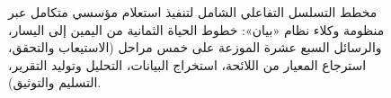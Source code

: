 \begin{figure}[H]
  \centering
  \resizebox{\textwidth}{!}{}
  \caption[مخطط التسلسل التفاعلي الشامل لمنظومة وكلاء نظام «بيان»]{مخطط التسلسل التفاعلي الشامل  لتنفيذ استعلام مؤسسي متكامل عبر منظومة وكلاء نظام «بيان»: خطوط الحياة الثمانية من اليمين إلى اليسار، والرسائل السبع عشرة الموزعة على خمس مراحل (الاستيعاب والتحقق، استرجاع المعيار من اللائحة، استخراج البيانات، التحليل وتوليد التقرير، التسليم والتوثيق).}
  \label{fig:agent-sequence}
\end{figure}

